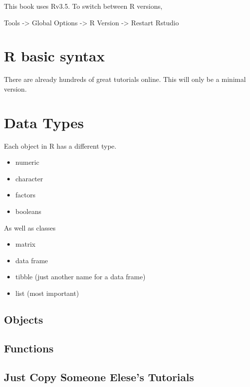\documentclass[]{book}
\providecommand{\tightlist}{%
  \setlength{\itemsep}{0pt}\setlength{\parskip}{0pt}}
\begin{document}
This book uses Rv3.5. To switch between R versions,

Tools -\textgreater{} Global Options -\textgreater{} R Version -\textgreater{} Restart Rstudio

\hypertarget{r-basic-syntax}{%
\section{R basic syntax}\label{r-basic-syntax}}

There are already hundreds of great tutorials online. This will only be a minimal version.

\hypertarget{data-types}{%
\section{Data Types}\label{data-types}}

Each object in R has a different type.

\begin{itemize}
\tightlist
\item
  numeric
\item
  character
\item
  factors
\item
  booleans
\end{itemize}

As well as classes

\begin{itemize}
\tightlist
\item
  matrix
\item
  data frame
\item
  tibble (just another name for a data frame)
\item
  list (most important)
\end{itemize}

\hypertarget{objects}{%
\subsection{Objects}\label{objects}}

\hypertarget{functions}{%
\subsection{Functions}\label{functions}}

\hypertarget{just-copy-someone-eleses-tutorials}{%
\subsection{Just Copy Someone Elese's Tutorials}\label{just-copy-someone-eleses-tutorials}}
\end{document}
